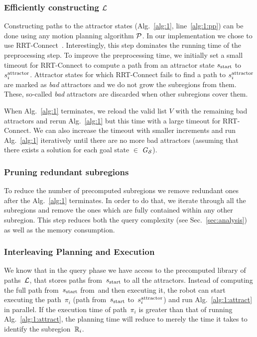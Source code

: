 \documentclass[a4paper,10pt]{article}
\begin{document}
\subsubsection{Efficiently constructing $\mathcal{L}$}
Constructing paths to the attractor states (Alg.~\ref{alg:1}, line~\ref{alg:1:pp}) can be done using any motion planning algorithm $\mathcal{P}$.
In our implementation we chose to use RRT-Connect~\cite{KL00}.
Interestingly, this step dominates the running time of the preprocessing step.
%
To improve the preprocessing time, we initially set a small timeout for RRT-Connect to compute a path from an attractor state $s_{\textrm{start}}$ to $s^{\text{attractor}}_i$.
Attractor states for which RRT-Connect fails to find a path to $s^{\text{attractor}}_i$ are marked as \textit{bad} attractors and we do not grow the subregions from them. 
These, so-called \textit{bad} attractors are discarded when other subregions cover them.

When Alg.~\ref{alg:1} terminates, we reload the valid list $V$ with the remaining bad attractors and rerun Alg.~\ref{alg:1} but this time with a large timeout for RRT-Connect. 
%
We can also increase the timeout with smaller increments and run Alg.~\ref{alg:1} iteratively until there are no more bad attractors (assuming that there exists a solution for each goal state $\in$ $G_\mathcal{S}$).


\subsubsection{Pruning redundant subregions}
To reduce the number of precomputed subregions we remove redundant ones after the Alg.~\ref{alg:1} terminates. 
In order to do that, we iterate through all the subregions and remove the ones which are fully contained within any other subregion. 
This step reduces both the query complexity (see Sec.~\ref{sec:analysis}) as well as the memory consumption.

\subsubsection{Interleaving Planning and Execution}
\label{subsubsec:interleave}
We know that in the query phase we have access to the precomputed library of paths~$\mathcal{L}$, that stores paths from~$s_{\text{start}}$ to all the attractors. Instead of computing the full path from~$s_{\text{start}}$ from~\sGoal and then executing it, the robot can start executing the path~$\pi_i$ (path from~$s_{\text{start}}$ to~$s^{\text{attractor}}_i$) and run Alg.~\ref{alg:1:attract} in parallel. If the execution time of path~$\pi_i$ is greater than that of running Alg.~\ref{alg:1:attract}, the planning time will reduce to merely the time it takes to identify the subregion~$\mathbb{R}_i$.
\end{document}
